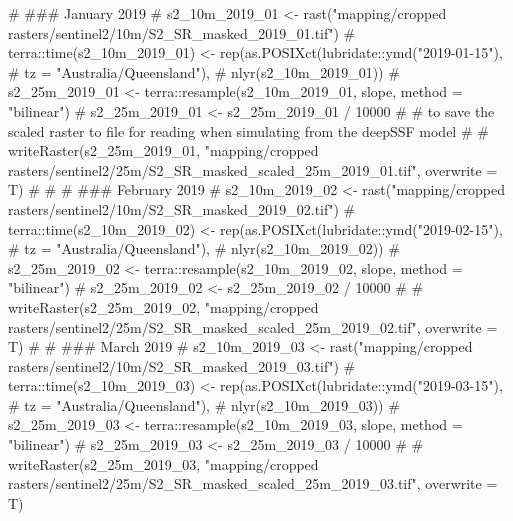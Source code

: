 \documentclass[
  letterpaper,
  DIV=11,
  numbers=noendperiod]{scrartcl}
\newenvironment{Shaded}{\begin{snugshade}}{\end{snugshade}}
\newcommand{\AlertTok}[1]{\textcolor[rgb]{0.68,0.00,0.00}{#1}}
\newcommand{\CommentTok}[1]{\textcolor[rgb]{0.37,0.37,0.37}{#1}}
\begin{document}
\begin{Shaded}
\begin{Highlighting}[]
\CommentTok{\# }\AlertTok{\#\#\#}\CommentTok{ January 2019}
\CommentTok{\# s2\_10m\_2019\_01 \textless{}{-} rast("mapping/cropped rasters/sentinel2/10m/S2\_SR\_masked\_2019\_01.tif")}
\CommentTok{\# terra::time(s2\_10m\_2019\_01) \textless{}{-} rep(as.POSIXct(lubridate::ymd("2019{-}01{-}15"), }
\CommentTok{\#                                               tz = "Australia/Queensland"), }
\CommentTok{\#                                    nlyr(s2\_10m\_2019\_01))}
\CommentTok{\# s2\_25m\_2019\_01 \textless{}{-} terra::resample(s2\_10m\_2019\_01, slope, method = "bilinear")}
\CommentTok{\# s2\_25m\_2019\_01 \textless{}{-} s2\_25m\_2019\_01 / 10000}
\CommentTok{\# \# to save the scaled raster to file for reading when simulating from the deepSSF model}
\CommentTok{\# \# writeRaster(s2\_25m\_2019\_01, "mapping/cropped rasters/sentinel2/25m/S2\_SR\_masked\_scaled\_25m\_2019\_01.tif", overwrite = T)}
\CommentTok{\# }
\CommentTok{\# }
\CommentTok{\# }\AlertTok{\#\#\#}\CommentTok{ February 2019}
\CommentTok{\# s2\_10m\_2019\_02 \textless{}{-} rast("mapping/cropped rasters/sentinel2/10m/S2\_SR\_masked\_2019\_02.tif")}
\CommentTok{\# terra::time(s2\_10m\_2019\_02) \textless{}{-} rep(as.POSIXct(lubridate::ymd("2019{-}02{-}15"), }
\CommentTok{\#                                               tz = "Australia/Queensland"), }
\CommentTok{\#                                    nlyr(s2\_10m\_2019\_02))}
\CommentTok{\# s2\_25m\_2019\_02 \textless{}{-} terra::resample(s2\_10m\_2019\_02, slope, method = "bilinear")}
\CommentTok{\# s2\_25m\_2019\_02 \textless{}{-} s2\_25m\_2019\_02 / 10000}
\CommentTok{\# \# writeRaster(s2\_25m\_2019\_02, "mapping/cropped rasters/sentinel2/25m/S2\_SR\_masked\_scaled\_25m\_2019\_02.tif", overwrite = T)}
\CommentTok{\# }
\CommentTok{\# }\AlertTok{\#\#\#}\CommentTok{ March 2019}
\CommentTok{\# s2\_10m\_2019\_03 \textless{}{-} rast("mapping/cropped rasters/sentinel2/10m/S2\_SR\_masked\_2019\_03.tif")}
\CommentTok{\# terra::time(s2\_10m\_2019\_03) \textless{}{-} rep(as.POSIXct(lubridate::ymd("2019{-}03{-}15"), }
\CommentTok{\#                                               tz = "Australia/Queensland"), }
\CommentTok{\#                                    nlyr(s2\_10m\_2019\_03))}
\CommentTok{\# s2\_25m\_2019\_03 \textless{}{-} terra::resample(s2\_10m\_2019\_03, slope, method = "bilinear")}
\CommentTok{\# s2\_25m\_2019\_03 \textless{}{-} s2\_25m\_2019\_03 / 10000}
\CommentTok{\# \# writeRaster(s2\_25m\_2019\_03, "mapping/cropped rasters/sentinel2/25m/S2\_SR\_masked\_scaled\_25m\_2019\_03.tif", overwrite = T)}

\end{Highlighting}
\end{Shaded}
\end{document}
